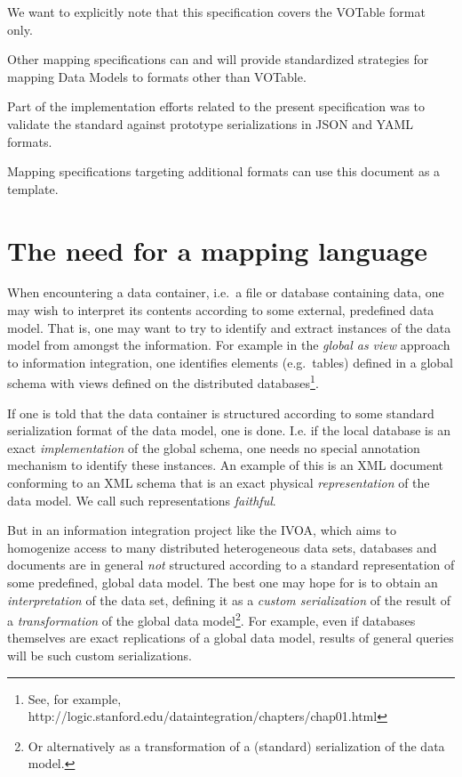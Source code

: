 \documentclass[11pt,a4paper]{ivoa}
\begin{document}
We want to explicitly note that this specification covers the VOTable
format only.

Other mapping specifications can and will provide standardized
strategies for mapping Data Models to formats other than VOTable.

Part of the implementation efforts related to the present specification
was to validate the standard against prototype serializations in JSON
and YAML formats.

Mapping specifications targeting additional formats can use this
document as a template.

\section{The need for a mapping
language}\label{the-need-for-a-mapping-language}

When encountering a data container, i.e.~a file or database containing
data, one may wish to interpret its contents according to some external,
predefined data model. That is, one may want to try to identify and
extract instances of the data model from amongst the information. For
example in the \emph{global as view} approach to information
integration, one identifies elements (e.g.~tables) defined in a global
schema with views defined on the distributed databases\footnote{See, for
  example,
  http://logic.stanford.edu/dataintegration/chapters/chap01.html}.

If one is told that the data container is structured according to some
standard serialization format of the data model, one is done. I.e. if
the local database is an exact \emph{implementation} of the global
schema, one needs no special annotation mechanism to identify these
instances. An example of this is an XML document conforming to an XML
schema that is an exact physical \emph{representation} of the data
model. We call such representations \emph{faithful}.

But in an information integration project like the IVOA, which aims to
homogenize access to many distributed heterogeneous data sets, databases
and documents are in general \emph{not} structured according to a
standard representation of some predefined, global data model. The best
one may hope for is to obtain an \emph{interpretation} of the data set,
defining it as a \emph{custom serialization} of the result of a
\emph{transformation} of the global data model\footnote{Or alternatively
  as a transformation of a (standard) serialization of the data model.}.
For example, even if databases themselves are exact replications of a
global data model, results of general queries will be such custom
serializations.
\end{document}
